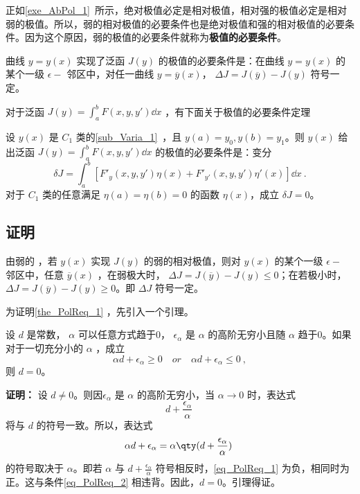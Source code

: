 

正如\autoref{exe_AbPol_1}~所示，绝对极值必定是相对极值，相对强的极值必定是相对弱的极值。所以，弱的相对极值的必要条件也是绝对极值和强的相对极值的必要条件。因为这个原因，弱的极值的必要条件就称为\textbf{极值的必要条件}。

曲线 $y=y(x)$ 实现了泛函 $J(y)$ 的极值的必要条件是：在曲线 $y=y(x)$ 的某个一级 $\epsilon-$ 邻区中，对任一曲线 $y=\overline{y}(x)$， $\Delta J=J(\overline{y})-J(y)$ 符号一定。

对于泛函 $J(y)=\int_a^bF(x,y,y')\dd x$ ，有下面关于极值的必要条件定理
\begin{theorem}{}\label{the_PolReq_1}
设 $y(x)$ 是 $C_1$ 类的\autoref{sub_Varia_1}~，且 $y(a)=y_0,y(b)=y_1$。则 $y(x)$ 给出泛函 $J(y)=\int_a^bF(x,y,y')\dd x$ 的极值的必要条件是：变分
\begin{equation}
\delta J=\int_a^b[F'_y(x,y,y')\eta(x)+F'_{y'}(x,y,y')\eta'(x)]\dd x~.
\end{equation}
对于 $C_1$ 类的任意满足 $\eta(a)=\eta(b)=0$ 的函数 $\eta(x)$，成立 $\delta J=0$。
\end{theorem}
\subsection{证明}
由弱的 ，若 $y(x)$ 实现 $J(y)$ 的弱的相对极值，则对 $y(x)$ 的某个一级 $\epsilon-$ 邻区中，任意 $\overline{y}(x)$ ，在弱极大时， $\Delta J=J(\overline{y})-J(y)\leq 0$；在若极小时，$\Delta J=J(\overline{y})-J(y)\geq 0$。即 $\Delta J$ 符号一定。

为证明\autoref{the_PolReq_1} ，先引入一个引理。
\begin{lemma}{}\label{lem_PolReq_1}
设 $d$ 是常数， $\alpha$ 可以任意方式趋于0， $\epsilon_\alpha$ 是 $\alpha$ 的高阶无穷小且随 $\alpha$ 趋于0。如果对于一切充分小的 $\alpha$ ，成立 
\begin{equation}\label{eq_PolReq_2}
\alpha d+\epsilon_\alpha\geq0\quad or\quad\alpha d+\epsilon_\alpha\leq0~,
\end{equation}
则 $d=0$。
\end{lemma}
\textbf{证明：} 设 $d\neq 0$。则因$\epsilon_\alpha$ 是 $\alpha$ 的高阶无穷小，当 $\alpha\rightarrow0$ 时，表达式
\begin{equation}
d+\frac{\epsilon_\alpha}{\alpha}~
\end{equation}
 将与 $d$ 的符号一致。所以，表达式
 \begin{equation}\label{eq_PolReq_1}
 \alpha d+\epsilon_\alpha=\alpha\qty(d+\frac{\epsilon_\alpha}{\alpha})~
 \end{equation}
 的符号取决于 $\alpha$。即若 $\alpha$ 与 $d+\frac{\epsilon_\alpha}{\alpha}$ 符号相反时，\autoref{eq_PolReq_1} 为负，相同时为正。这与条件\autoref{eq_PolReq_2} 相违背。因此，$d=0$。引理得证。
